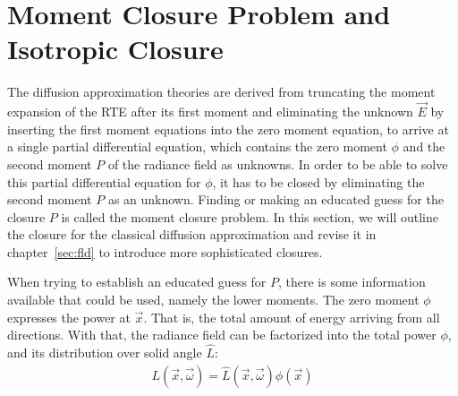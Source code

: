 \section{Moment Closure Problem and Isotropic Closure}
\label{sec:moment_closure}

The diffusion approximation theories are derived from truncating the moment expansion of the RTE after its first moment and eliminating the unknown $\vec{E}$ by inserting the first moment equations into the zero moment equation, to arrive at a single partial differential equation, which contains the zero moment $\phi$ and the second moment $P$ of the radiance field as unknowns. In order to be able to solve this partial differential equation for $\phi$, it has to be closed by eliminating the second moment $P$ as an unknown. Finding or making an educated guess for the closure $P$ is called the moment closure problem. In this section, we will outline the closure for the classical diffusion approximation and revise it in chapter~\ref{sec:fld} to introduce more sophisticated closures.

When trying to establish an educated guess for $P$, there is some information available that could be used, namely the lower moments. The zero moment $\phi$ expresses the power at $\vec{x}$. That is, the total amount of energy arriving from all directions. With that, the radiance field can be factorized into the total power $\phi$, and its distribution over solid angle $\hat{L}$:
\begin{align*}
L(\vec{x}, \vec{\omega}) = \hat{L}(\vec{x}, \vec{\omega})\phi(\vec{x})
\end{align*}

